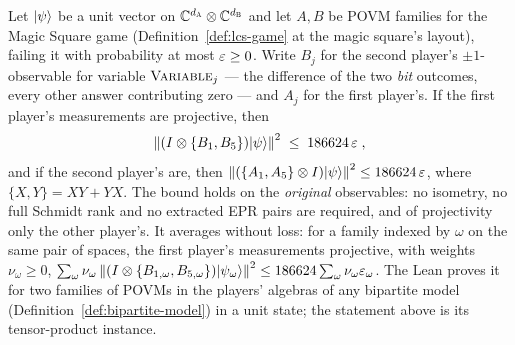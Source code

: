 \begin{lemma}
\label{lem:ms-direct-anticomm}
\leanok
Let $|\psi\rangle$ be a unit vector on $\mathbb{C}^{d_{\textsc{A}}} \otimes \mathbb{C}^{d_{\textsc{B}}}$ and let $A, B$ be POVM
families for the Magic Square game (Definition~\ref{def:lcs-game} at the magic square's layout),
failing it with probability at most $\varepsilon \geq 0$. Write $B_j$ for the second player's
$\pm 1$-observable for variable $\textsc{Variable}_j$ --- the difference of the two \emph{bit} outcomes,
every other answer contributing zero --- and $A_j$ for the first player's. If the first player's
measurements are projective, then
\begin{equation*}
  \left\| { (I \otimes \{ B_1, B_5 \}) |\psi\rangle } \right\|^2 \;\leq\; 186624\, \varepsilon\;,
\end{equation*}
and if the second player's are, then
$\left\| { (\{ A_1, A_5 \} \otimes I) |\psi\rangle } \right\|^2 \leq 186624\, \varepsilon$, where
$\{X, Y\} = XY + YX$. The bound holds on the \emph{original} observables: no isometry, no full
Schmidt rank and no extracted EPR pairs are required, and of projectivity only the other player's.
It averages without loss: for a family indexed by $\omega$ on the same pair of spaces, the first
player's measurements projective, with weights $\nu_\omega \geq 0$,
$\sum_\omega \nu_\omega \left\| {(I \otimes \{B_{1,\omega}, B_{5,\omega}\})|\psi_\omega\rangle} \right\|^2
\leq 186624 \sum_\omega \nu_\omega \varepsilon_\omega$.
The Lean proves it for two families of POVMs in the players' algebras of any bipartite model
(Definition~\ref{def:bipartite-model}) in a unit state; the statement above is its
tensor-product instance.
\end{lemma}

